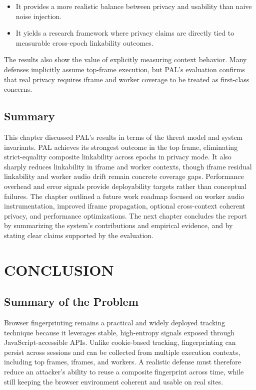 \documentclass[11pt]{report}
\begin{document}
\begin{itemize}
    \item It provides a more realistic balance between privacy and usability than naive noise injection.
    \item It yields a research framework where privacy claims are directly tied to measurable cross-epoch linkability outcomes.
\end{itemize}

The results also show the value of explicitly measuring context behavior. Many defenses implicitly assume top-frame execution, but PAL’s evaluation confirms that real privacy requires iframe and worker coverage to be treated as first-class concerns.

\section{Summary}

This chapter discussed PAL’s results in terms of the threat model and system invariants. PAL achieves its strongest outcome in the top frame, eliminating strict-equality composite linkability across epochs in privacy mode. It also sharply reduces linkability in iframe and worker contexts, though iframe residual linkability and worker audio drift remain concrete coverage gaps. Performance overhead and error signals provide deployability targets rather than conceptual failures. The chapter outlined a future work roadmap focused on worker audio instrumentation, improved iframe propagation, optional cross-context coherent privacy, and performance optimizations. The next chapter concludes the report by summarizing the system’s contributions and empirical evidence, and by stating clear claims supported by the evaluation.













\chapter{CONCLUSION}

\section{Summary of the Problem}

Browser fingerprinting remains a practical and widely deployed tracking technique because it leverages stable, high-entropy signals exposed through JavaScript-accessible APIs. Unlike cookie-based tracking, fingerprinting can persist across sessions and can be collected from multiple execution contexts, including top frames, iframes, and workers. A realistic defense must therefore reduce an attacker’s ability to reuse a composite fingerprint across time, while still keeping the browser environment coherent and usable on real sites.
\end{document}
